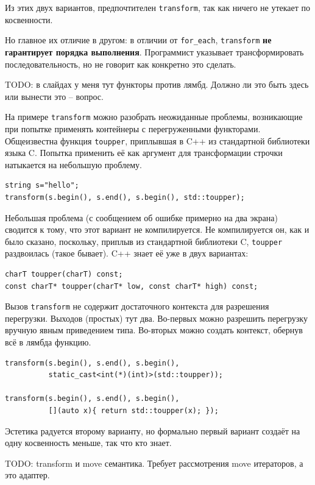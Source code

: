 \documentclass[a4paper,12pt,oneside]{book}
\begin{document}
Из этих двух вариантов, предпочтителен \lstinline!transform!, так как ничего не утекает по косвенности. 

Но главное их отличие в другом: в отличии от \lstinline!for_each!, \lstinline!transform! \textbf{не гарантирует порядка выполнения}. Программист указывает трансформировать последовательность, но не говорит как конкретно это сделать.

TODO: в слайдах у меня тут функторы против лямбд. Должно ли это быть здесь или вынести это -- вопрос.

На примере \lstinline!transform! можно разобрать неожиданные проблемы, возникающие при попытке применять контейнеры с перегруженными функторами. Общеизвестна функция \lstinline!toupper!, приплывшая в C++ из стандартной библиотеки языка C. Попытка применить её как аргумент для трансформации строчки натыкается на небольшую проблему.

\begin{lstlisting}
string s="hello";
transform(s.begin(), s.end(), s.begin(), std::toupper);
\end{lstlisting}

Небольшая проблема (с сообщением об ошибке примерно на два экрана) сводится к тому, что этот вариант не компилируется. Не компилируется он, как и было сказано, поскольку, приплыв из стандартной библиотеки C, \lstinline!toupper! раздвоилась (такое бывает). C++ знает её уже в двух вариантах:

\begin{lstlisting}
charT toupper(charT) const;
const charT* toupper(charT* low, const charT* high) const;
\end{lstlisting}

Вызов \lstinline!transform! не содержит достаточного контекста для разрешения перегрузки. Выходов (простых) тут два. Во-первых можно разрешить перегрузку вручную явным приведением типа. Во-вторых можно создать контекст, обернув всё в лямбда функцию.

\begin{lstlisting}
transform(s.begin(), s.end(), s.begin(),
          static_cast<int(*)(int)>(std::toupper));

transform(s.begin(), s.end(), s.begin(), 
          [](auto x){ return std::toupper(x); });
\end{lstlisting}

Эстетика радуется второму варианту, но формально первый вариант создаёт на одну косвенность меньше, так что кто знает. 

TODO: transform и move семантика. Требует рассмотрения move итераторов, а это адаптер.
\end{document}
